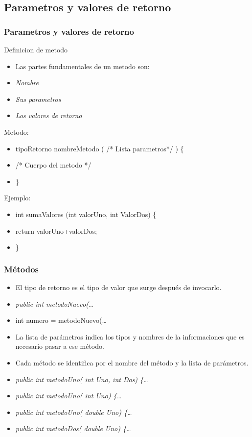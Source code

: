 \documentclass{beamer}
\begin{document}
\subsection{Parametros y valores de retorno}
\begin{frame}
\frametitle{Parametros y valores de retorno}
\begin{footnotesize}
\begin{block}{Definicion de metodo}
\begin{itemize}[<+->]
\item Las partes fundamentales de un metodo son:
\item \emph{Nombre}
\item \emph{Sus parametros}
\item \emph{Los valores de retorno}
\end{itemize}
\end{block}
\pause
\begin{block}{Metodo:}
\begin{itemize}[<+-|alert@+>]
\item tipoRetorno nombreMetodo ( /* Lista parametros*/ ) \{
\item /* Cuerpo del metodo */
\item \}
\end{itemize}
\end{block}
\pause
\begin{block}{Ejemplo:}
\begin{itemize}[<+-|alert@+>]
\item int sumaValores  (int valorUno, int ValorDos) \{
\item return valorUno+valorDos;
\item \}
\end{itemize}
\end{block}
\end{footnotesize}
\pause
\end{frame}

\begin{frame}
\frametitle{Métodos}
\begin{itemize}[<+->]
\item El tipo de retorno es el tipo de valor que surge después de invocarlo.
\item \emph{public int metodoNuevo(\dots} 
\item int numero = metodoNuevo(\dots
\item La lista de parámetros indica los tipos y nombres de la informaciones que es necesario pasar a ese método.
\item Cada método se identifica por el nombre del método y la lista de parámetros.
\item \emph{public int metodoUno( int Uno, int Dos) \{\dots}
\item \emph{public int metodoUno( int Uno) \{\dots}
\item \emph{public int metodoUno( double Uno) \{\dots}
\item \emph{public int metodoDos( double Uno) \{\dots}
\end{itemize}
\pause
\end{frame}
\end{document}
